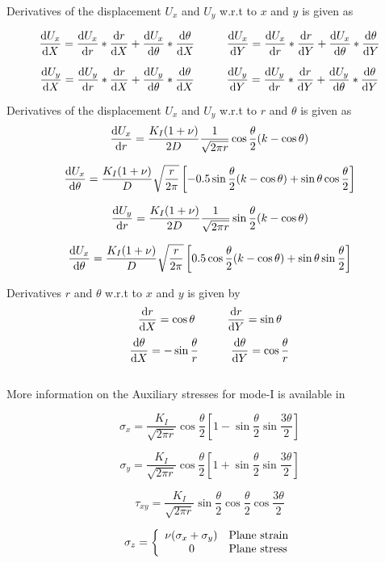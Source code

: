 \documentclass[fleqn, 12.5pt,a4paper]{report}
\newcommand\tab[1][1cm]{\hspace*{#1}}
\begin{document}
Derivatives of the displacement $U_x$ and $U_y$ w.r.t to $x$ and $y$ \cite{nagashima2003stress} is given as

$$\dv{U_x}{X} = \dv{U_x}{r}*\dv{r}{X} + \dv{U_x}{\theta}*\dv{\theta}{X} \tab[1cm] \dv{U_x}{Y} = \dv{U_x}{r}*\dv{r}{Y} + \dv{U_x}{\theta}*\dv{\theta}{Y}$$

$$\dv{U_y}{X} = \dv{U_y}{r}*\dv{r}{X} + \dv{U_y}{\theta}*\dv{\theta}{X} \tab[1cm] \dv{U_y}{Y} = \dv{U_y}{r}*\dv{r}{Y} + \dv{U_y}{\theta}*\dv{\theta}{Y}$$\vspace{0.2cm}

Derivatives of the displacement $U_x$ and $U_y$ w.r.t to $r$ and $\theta$ \cite{nagashima2003stress}is given as 
$$\dv{U_x}{r} = \frac{K_I(1+\nu)}{2D} \frac{1}{\sqrt{2\pi r}} \cos\frac{\theta}{2} (k-\cos\theta)$$

$$\dv{U_x}{\theta} = \frac{K_I(1+\nu)}{D} \sqrt{\frac{r}{2\pi}} \left[-0.5\sin\frac{\theta}{2} (k-\cos\theta) + \sin\theta \cos\frac{\theta}{2} \right]$$

$$\dv{U_y}{r} = \frac{K_I(1+\nu)}{2D} \frac{1}{\sqrt{2\pi r}} \sin\frac{\theta}{2} (k-\cos\theta)$$

$$\dv{U_x}{\theta} = \frac{K_I(1+\nu)}{D} \sqrt{\frac{r}{2\pi}} \left[0.5\cos\frac{\theta}{2} (k-\cos\theta) + \sin\theta \sin\frac{\theta}{2} \right]$$\vspace{0.2cm}

Derivatives $r$ and $\theta$ w.r.t to $x$ and $y$ \cite{khoei2014extended} is given by
$$\dv{r}{X} = \cos\theta \tab[1cm] \dv{r}{Y} = \sin\theta$$
$$\dv{\theta}{X} = -\sin\frac{\theta}{r} \tab[1cm] \dv{\theta}{Y} = \cos\frac{\theta}{r}$$
\subsection{\color{Black}{Auxiliary stresses for mode-I}}
More information on the Auxiliary stresses for mode-I is available in \cite{khoei2014extended}

$$\sigma_{x} = \frac{K_I}{\sqrt{2\pi r}} \cos\frac{\theta}{2} \left[1-\sin\frac{\theta}{2} \sin\frac{3\theta}{2}\right]$$ 

$$\sigma_{y} = \frac{K_I}{\sqrt{2\pi r}} \cos\frac{\theta}{2} \left[1+\sin\frac{\theta}{2} \sin\frac{3\theta}{2}\right]$$ 

$$\tau_{xy} = \frac{K_I}{\sqrt{2\pi r}} \sin\frac{\theta}{2} \cos\frac{\theta}{2} \cos\frac{3\theta}{2}$$ 

$$
\sigma_{z} = 
\left\{
\begin{array}{ll}
\nu(\sigma_x + \sigma_y) & \mbox{Plane strain}\\
\tab[0.75cm] 0 & \mbox{Plane stress}\\
\end{array}
\right.
$$
\end{document}

